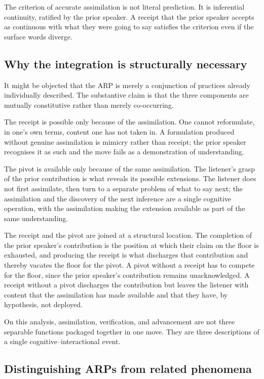 The criterion of accurate assimilation is not literal prediction. It is inferential continuity, ratified by the prior speaker. A receipt that the prior speaker accepts as continuous with what they were going to say satisfies the criterion even if the surface words diverge.

\subsection{Why the integration is structurally necessary}\label{sec:nontrivial}

It might be objected that the ARP is merely a conjunction of practices already individually described. The substantive claim is that the three components are mutually constitutive rather than merely co-occurring.

The receipt is possible only because of the assimilation. One cannot reformulate, in one's own terms, content one has not taken in. A formulation produced without genuine assimilation is mimicry rather than receipt; the prior speaker recognises it as such and the move fails as a demonstration of understanding.

The pivot is available only because of the same assimilation. The listener's grasp of the prior contribution is what reveals its possible extensions. The listener does not first assimilate, then turn to a separate problem of what to say next; the assimilation and the discovery of the next inference are a single cognitive operation, with the assimilation making the extension available as part of the same understanding.

The receipt and the pivot are joined at a structural location. The completion of the prior speaker's contribution is the position at which their claim on the floor is exhausted, and producing the receipt is what discharges that contribution and thereby vacates the floor for the pivot. A pivot without a receipt has to compete for the floor, since the prior speaker's contribution remains unacknowledged. A receipt without a pivot discharges the contribution but leaves the listener with content that the assimilation has made available and that they have, by hypothesis, not deployed.

On this analysis, assimilation, verification, and advancement are not three separable functions packaged together in one move. They are three descriptions of a single cognitive--interactional event.

\subsection{Distinguishing ARPs from related phenomena}

